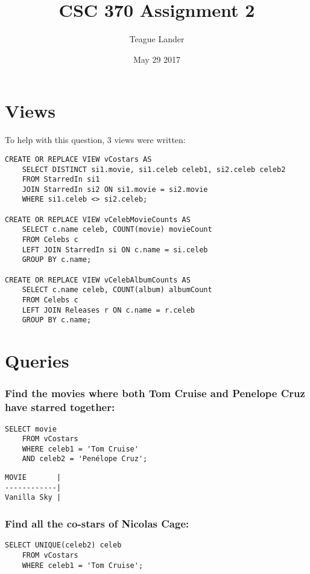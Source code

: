 \documentclass{article}
\title{CSC 370 Assignment 2}
\author{ Teague Lander }
\date{May 29 2017}
\begin{document}
\maketitle

\section*{Views}
    To help with this question, 3 views were written:
    \\
    \begin{verbatim}
CREATE OR REPLACE VIEW vCostars AS
    SELECT DISTINCT si1.movie, si1.celeb celeb1, si2.celeb celeb2
    FROM StarredIn si1
    JOIN StarredIn si2 ON si1.movie = si2.movie
    WHERE si1.celeb <> si2.celeb;
    
CREATE OR REPLACE VIEW vCelebMovieCounts AS
    SELECT c.name celeb, COUNT(movie) movieCount
    FROM Celebs c
    LEFT JOIN StarredIn si ON c.name = si.celeb
    GROUP BY c.name;
	
CREATE OR REPLACE VIEW vCelebAlbumCounts AS
    SELECT c.name celeb, COUNT(album) albumCount
    FROM Celebs c
    LEFT JOIN Releases r ON c.name = r.celeb
    GROUP BY c.name;
    \end{verbatim}
    
\section*{Queries}
    
    \subsubsection*{Find the movies where both Tom Cruise and Penelope Cruz have starred together:}
        \begin{verbatim}
SELECT movie
    FROM vCostars
    WHERE celeb1 = 'Tom Cruise'
    AND celeb2 = 'Penélope Cruz';\end{verbatim}
    
        \begin{verbatim}
MOVIE       |
------------|
Vanilla Sky |
        \end{verbatim}
        
    \subsubsection*{Find all the co-stars of Nicolas Cage:}
        \begin{verbatim}
SELECT UNIQUE(celeb2) celeb
    FROM vCostars
    WHERE celeb1 = 'Tom Cruise';\end{verbatim}
    
\end{document}
